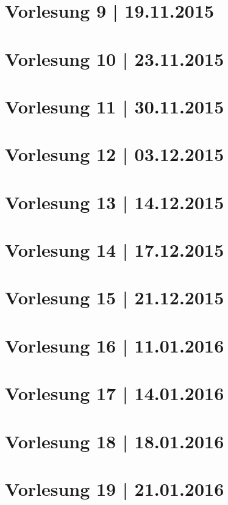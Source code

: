 \newpage
\part*{Vorlesung 9 | 19.11.2015}

\newpage
\part*{Vorlesung 10 | 23.11.2015}

\newpage
\part*{Vorlesung 11 | 30.11.2015}

\newpage
\part*{Vorlesung 12 | 03.12.2015}


\newpage
\part*{Vorlesung 13 | 14.12.2015}

\newpage
\part*{Vorlesung 14 | 17.12.2015}

\newpage
\part*{Vorlesung 15 | 21.12.2015}


\newpage
\part*{Vorlesung 16 | 11.01.2016}


\newpage
\part*{Vorlesung 17 | 14.01.2016}


\newpage
\part*{Vorlesung 18 | 18.01.2016}

\newpage
\part*{Vorlesung 19 | 21.01.2016}


